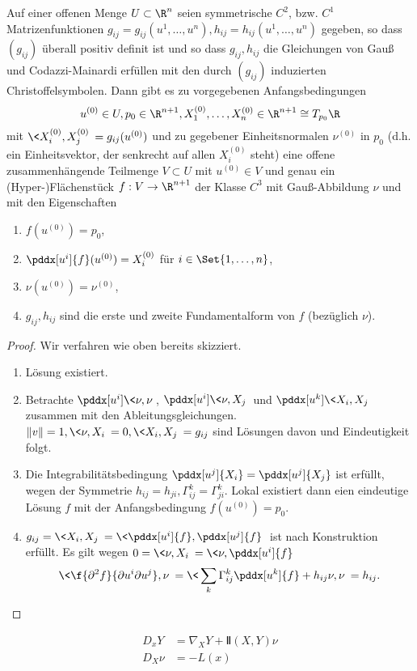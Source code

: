 \begin{st}
	Auf einer offenen Menge $U \subset \R^n$ seien symmetrische $C^2$, bzw. $C^1$ Matrizenfunktionen $g_{ij} = g_{ij}(u^1, \dotsc, u^n), h_{ij} = h_{ij}(u^1, \dotsc, u^n)$ gegeben, so dass $(g_{ij})$ überall positiv definit ist und so dass $g_{ij}, h_{ij}$ die Gleichungen von Gauß und Codazzi-Mainardi erfüllen mit den durch $(g_{ij})$ induzierten Christoffelsymbolen.
	Dann gibt es zu vorgegebenen Anfangsbedingungen
	\[
		u^{(0)} \in U, p_0 \in \R^{n+1}, X_1^{(0)}, \dotsc, X_n^{(0)} \in \R^{n+1} \isomorphic T_{p_0} \R
	\]
	mit $\<X_i^{(0)}, X_j^{(0)}\> = g_{ij}(u^{(0)})$ und zu gegebener Einheitsnormalen $\nu^{(0)}$ in $p_0$ (d.h. ein Einheitsvektor, der senkrecht auf allen $X_i^{(0)}$ steht) eine offene zusammenhängende Teilmenge $V \subset U$ mit $u^{(0)} \in V$ und genau ein (Hyper-)Flächenstück $f: V \to \R^{n+1}$ der Klasse $C^3$ mit Gauß-Abbildung $\nu$ und mit den Eigenschaften
	\begin{enumerate}[1.]
		\item
			$f(u^{(0)}) = p_0$,
		\item
			$\pddx[u^i]{f}(u^{(0)}) = X_i^{(0)}$ für $i \in \Set{1,\dotsc, n}$,
		\item
			$\nu(u^{(0)}) = \nu^{(0)}$,
		\item
			$g_{ij}, h_{ij}$ sind die erste und zweite Fundamentalform von $f$ (bezüglich $\nu$).
	\end{enumerate}
	\begin{proof}
		Wir verfahren wie oben bereits skizziert.
		\begin{enumerate}[1.]
			\item
				Lösung existiert.
			\item
				Betrachte $\pddx[u^i]\<\nu, \nu\>$, $\pddx[u^i]\<\nu, X_j\>$ und $\pddx[u^k] \<X_i, X_j\>$ zusammen mit den Ableitungsgleichungen.
				$\|v\| =1, \<\nu, X_i\> = 0, \<X_i, X_j\> = g_{ij}$ sind Lösungen davon und Eindeutigkeit folgt.
			\item
				Die Integrabilitätsbedingung $\pddx[u^j]{X_i} = \pddx[u^j]{X_j}$ ist erfüllt, wegen der Symmetrie $h_{ij} = h_{ji}, \Gamma_{ij}^k = \Gamma_{ji}^k$.
				Lokal existiert dann eien eindeutige Lösung $f$ mit der Anfangsbedingung $f(u^{(0)}) = p_0$.
			\item
				$g_{ij} = \<X_i, X_j\> = \< \pddx[u^i]{f}, \pddx[u^j]{f} \>$ ist nach Konstruktion erfüllt.
				Es gilt wegen $0 = \<\nu, X_i\> = \<\nu, \pddx[u^i]{f}\>$
				\[
					\< \f{\partial^2 f}{\partial u^i \partial u^j}, \nu\>
					= \< \sum_{k} \Gamma_{ij}^k \pddx[u^k]{f} + h_{ij} \nu, \nu \>
					= h_{ij}.
				\]
		\end{enumerate}
	\end{proof}
	\begin{note}
		\begin{align*}
			D_x Y &= \nabla_X Y + Ⅱ(X,Y) \nu \\
			D_X \nu &= -L(x)
		\end{align*}
	\end{note}
\end{st}


